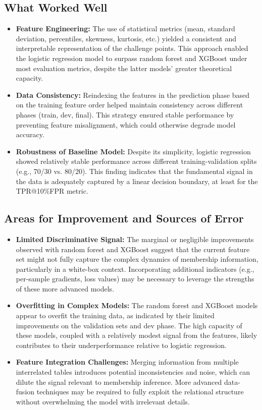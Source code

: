 \documentclass[12pt]{article}
\begin{document}
\subsection*{What Worked Well}
\begin{itemize}
    \item \textbf{Feature Engineering:}  
    The use of statistical metrics (mean, standard deviation, percentiles, skewness, kurtosis, etc.) yielded a consistent and interpretable representation of the challenge points. This approach enabled the logistic regression model to surpass random forest and XGBoost under most evaluation metrics, despite the latter models’ greater theoretical capacity.

    \item \textbf{Data Consistency:}  
    Reindexing the features in the prediction phase based on the training feature order helped maintain consistency across different phases (train, dev, final). This strategy ensured stable performance by preventing feature misalignment, which could otherwise degrade model accuracy.

    \item \textbf{Robustness of Baseline Model:}  
    Despite its simplicity, logistic regression showed relatively stable performance across different training-validation splits (e.g., 70/30 vs. 80/20). This finding indicates that the fundamental signal in the data is adequately captured by a linear decision boundary, at least for the TPR@10\%FPR metric.
\end{itemize}

\subsection*{Areas for Improvement and Sources of Error}
\begin{itemize}
    \item \textbf{Limited Discriminative Signal:}  
    The marginal or negligible improvements observed with random forest and XGBoost suggest that the current feature set might not fully capture the complex dynamics of membership information, particularly in a white-box context. Incorporating additional indicators (e.g., per-sample gradients, loss values) may be necessary to leverage the strengths of these more advanced models.

    \item \textbf{Overfitting in Complex Models:}  
    The random forest and XGBoost models appear to overfit the training data, as indicated by their limited improvements on the validation sets and dev phase. The high capacity of these models, coupled with a relatively modest signal from the features, likely contributes to their underperformance relative to logistic regression.

    \item \textbf{Feature Integration Challenges:}  
    Merging information from multiple interrelated tables introduces potential inconsistencies and noise, which can dilute the signal relevant to membership inference. More advanced data-fusion techniques may be required to fully exploit the relational structure without overwhelming the model with irrelevant details.
\end{itemize}
\end{document}
